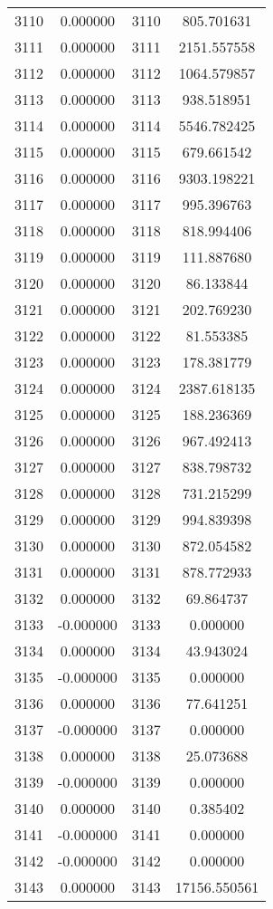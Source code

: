 \documentclass[12pt]{article}
\begin{document}
\begin{longtable}{@{}cccc@{}}
3110 & 0.000000 & 3110 & 805.701631 \\
3111 & 0.000000 & 3111 & 2151.557558 \\
3112 & 0.000000 & 3112 & 1064.579857 \\
3113 & 0.000000 & 3113 & 938.518951 \\
3114 & 0.000000 & 3114 & 5546.782425 \\
3115 & 0.000000 & 3115 & 679.661542 \\
3116 & 0.000000 & 3116 & 9303.198221 \\
3117 & 0.000000 & 3117 & 995.396763 \\
3118 & 0.000000 & 3118 & 818.994406 \\
3119 & 0.000000 & 3119 & 111.887680 \\
3120 & 0.000000 & 3120 & 86.133844 \\
3121 & 0.000000 & 3121 & 202.769230 \\
3122 & 0.000000 & 3122 & 81.553385 \\
3123 & 0.000000 & 3123 & 178.381779 \\
3124 & 0.000000 & 3124 & 2387.618135 \\
3125 & 0.000000 & 3125 & 188.236369 \\
3126 & 0.000000 & 3126 & 967.492413 \\
3127 & 0.000000 & 3127 & 838.798732 \\
3128 & 0.000000 & 3128 & 731.215299 \\
3129 & 0.000000 & 3129 & 994.839398 \\
3130 & 0.000000 & 3130 & 872.054582 \\
3131 & 0.000000 & 3131 & 878.772933 \\
3132 & 0.000000 & 3132 & 69.864737 \\
3133 & -0.000000 & 3133 & 0.000000 \\
3134 & 0.000000 & 3134 & 43.943024 \\
3135 & -0.000000 & 3135 & 0.000000 \\
3136 & 0.000000 & 3136 & 77.641251 \\
3137 & -0.000000 & 3137 & 0.000000 \\
3138 & 0.000000 & 3138 & 25.073688 \\
3139 & -0.000000 & 3139 & 0.000000 \\
3140 & 0.000000 & 3140 & 0.385402 \\
3141 & -0.000000 & 3141 & 0.000000 \\
3142 & -0.000000 & 3142 & 0.000000 \\
3143 & 0.000000 & 3143 & 17156.550561 \\

\end{longtable}
\end{document}
